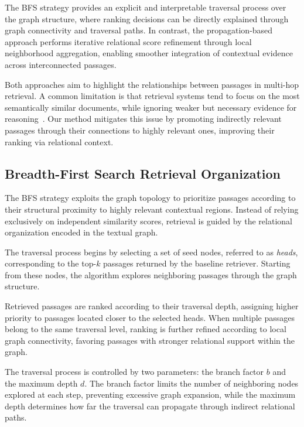 \documentclass[11pt]{article}
\begin{document}
The BFS strategy provides an explicit and interpretable traversal process over the graph structure, where ranking decisions can be directly explained through graph connectivity and traversal paths. In contrast, the propagation-based approach performs iterative relational score refinement through local neighborhood aggregation, enabling smoother integration of contextual evidence across interconnected passages.

Both approaches aim to highlight the relationships between passages in multi-hop retrieval. A common limitation is that retrieval systems tend to focus on the most semantically similar documents, while ignoring weaker but necessary evidence for reasoning~\cite{DBLP:conf/iclr/XiongLIDLWMY0KO21}. Our method mitigates this issue by promoting indirectly relevant passages through their connections to highly relevant ones, improving their ranking via relational context.

\subsection{Breadth-First Search Retrieval Organization}\label{section:BFSR}


The BFS strategy exploits the graph topology to prioritize passages according to their structural proximity to highly relevant contextual regions. Instead of relying exclusively on independent similarity scores, retrieval is guided by the relational organization encoded in the textual graph.

The traversal process begins by selecting a set of seed nodes, referred to as \emph{heads}, corresponding to the top-$k$ passages returned by the baseline retriever. Starting from these nodes, the algorithm explores neighboring passages through the graph structure.

Retrieved passages are ranked according to their traversal depth, assigning higher priority to passages located closer to the selected heads. When multiple passages belong to the same traversal level, ranking is further refined according to local graph connectivity, favoring passages with stronger relational support within the graph.

The traversal process is controlled by two parameters: the branch factor $b$ and the maximum depth $d$. The branch factor limits the number of neighboring nodes explored at each step, preventing excessive graph expansion, while the maximum depth determines how far the traversal can propagate through indirect relational paths.
\end{document}
